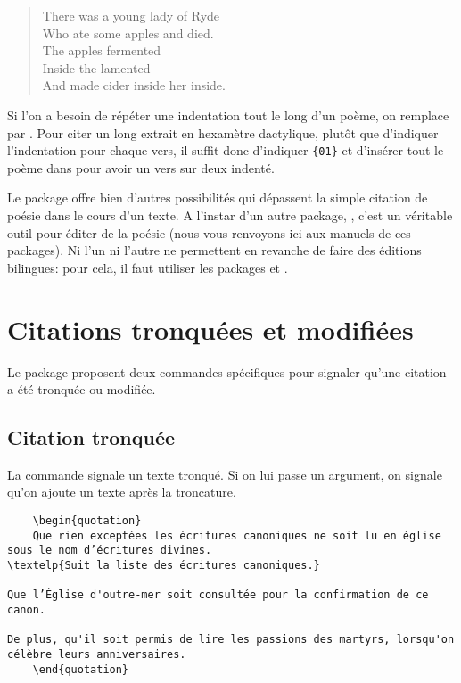 \begin{verse} 

 \begin{patverse} 

\vin There was a young lady of Ryde \\
 Who ate some apples and died.  \\
 The apples fermented \\
 Inside the lamented \\
 And made cider inside her inside. \\

\end{patverse}  \end{verse} 
 
 Si l'on a besoin de répéter une indentation tout le long d'un poème, on remplace  par . Pour citer un long extrait en hexamètre dactylique, plutôt que d'indiquer l'indentation pour chaque vers, il suffit donc d'indiquer \verb|{01}| et d'insérer tout le poème  dans  pour avoir un vers sur deux indenté.
 
 
 Le package  offre bien d'autres possibilités qui dépassent la simple citation de poésie dans le cours d'un texte. A l'instar d'un autre package, , c'est un véritable outil pour éditer de la poésie (nous vous renvoyons ici aux manuels de ces packages). Ni l'un ni l'autre ne permettent en revanche de faire des éditions bilingues: pour cela, il faut utiliser les packages  et . 


\section{Citations tronquées et modifiées}

Le package  proposent deux commandes spécifiques pour signaler qu'une citation a été tronquée ou modifiée.

\subsection{Citation tronquée}

La commande  signale un texte tronqué. Si on lui passe un argument, on signale qu'on ajoute un texte après la troncature.

\begin{verbatim}
	\begin{quotation}
	Que rien exceptées les écritures canoniques ne soit lu en église sous le nom d’écritures divines.
\textelp{Suit la liste des écritures canoniques.}

Que l’Église d'outre-mer soit consultée pour la confirmation de ce canon.

De plus, qu'il soit permis de lire les passions des martyrs, lorsqu'on célèbre leurs anniversaires.
	\end{quotation}
\end{verbatim}


